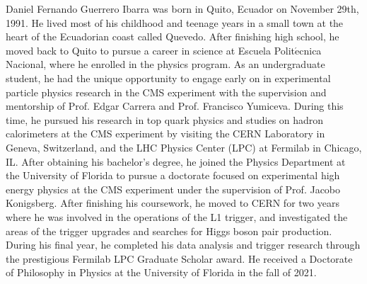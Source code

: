 Daniel Fernando Guerrero Ibarra was born in Quito, Ecuador on November 29th, 1991. He lived most of his childhood and teenage years in a small town at the heart of the Ecuadorian coast called Quevedo. After finishing high school, he moved back to Quito to pursue a career in science at Escuela Polit$\mathrm{\acute{e}}$cnica Nacional, where he enrolled in the physics program. As an undergraduate student, he had the unique opportunity to engage early on in experimental particle physics research in the CMS experiment with the supervision and mentorship of Prof. Edgar Carrera and Prof. Francisco Yumiceva. During this time, he pursued his research in top quark physics and studies on hadron calorimeters at the CMS experiment by visiting the CERN Laboratory in Geneva, Switzerland, and the LHC Physics Center (LPC) at Fermilab in Chicago, IL. After obtaining his bachelor's degree, he joined the Physics Department at the University of Florida to pursue a doctorate focused on experimental high energy physics at the CMS experiment under the supervision of Prof. Jacobo Konigsberg. After finishing his coursework, he moved to CERN for two years where he was involved in the operations of the L1 trigger, and investigated the areas of the trigger upgrades and searches for Higgs boson pair production. During his final year, he completed his data analysis and trigger research through the prestigious Fermilab LPC Graduate Scholar award. He received a Doctorate of Philosophy in Physics at the University of Florida in the fall of 2021.